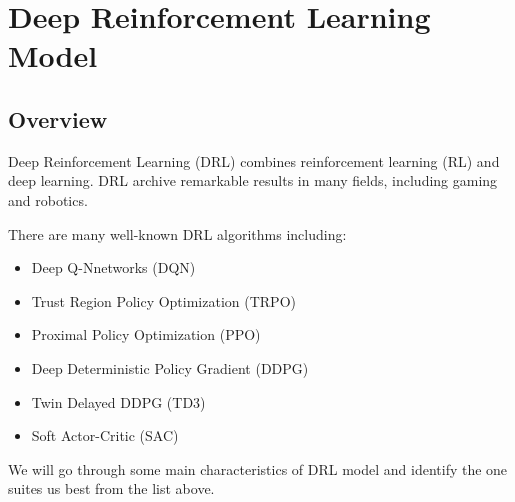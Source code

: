 \chapter{Deep Reinforcement Learning Model}
\label{c:drl}
\section{Overview}
Deep Reinforcement Learning (DRL) combines reinforcement learning (RL) and deep learning. DRL archive remarkable results in many fields, including gaming\cite{mnih2013playing} and robotics\cite{levine2016end}. 
\par 
There are many well-known DRL algorithms including: 
\begin{itemize}
    \item Deep Q-Nnetworks (DQN) \cite{mnih2013playing}
    \item Trust Region Policy Optimization (TRPO) \cite{schulman2015trust}
    \item Proximal Policy Optimization (PPO) \cite{schulman2017proximal}
    \item Deep Deterministic Policy Gradient (DDPG) \cite{silver2014deterministic}
    \item Twin Delayed DDPG (TD3) \cite{fujimoto2018addressing}
    \item Soft Actor-Critic (SAC) \cite{haarnoja2018soft} 
\end{itemize}

We will go through some main characteristics of DRL model and identify the one suites us best from the list above.

